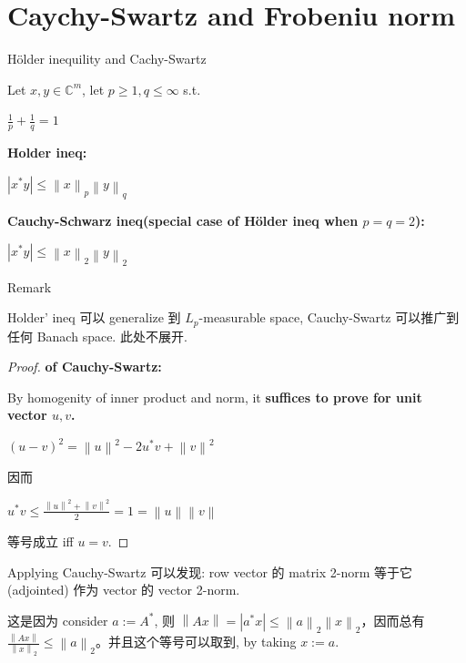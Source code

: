 \section{Caychy-Swartz and Frobeniu norm}

\begin{theorem}{Hölder inequility and Cachy-Swartz}

Let \(x,y \in \mathbb{C}^{m}\), let \(p \geq 1,q \leq \infty\) s.t.

\(\frac{1}{p} + \frac{1}{q} = 1\)

\textbf{Holder ineq:}

\(\left| {x^{\ast}y} \right| \leq \left\| x \right\|_{p}\left\| y \right\|_{q}\)

\textbf{Cauchy-Schwarz ineq(special case of Hölder ineq when \(p = q = 2\)):}

\(\left| {x^{\ast}y} \right| \leq \left\| x \right\|_{2}\left\| y \right\|_{2}\)

\end{theorem}

\begin{qlremark}{Remark}

Holder' ineq 可以 generalize 到 \(L_{p}\)-measurable space, Cauchy-Swartz 可以推广到任何 Banach space. 此处不展开.

\end{qlremark}

\begin{proof}

\textbf{of Cauchy-Swartz:}

By homogenity of inner product and norm, it \textbf{suffices to prove for unit vector \(u,v\).}

\(\left( {u - v} \right)^{2} = \left\| u \right\|^{2} - 2u^{\ast}v + \left\| v \right\|^{2}\)

因而

\(u^{\ast}v \leq \frac{\left\| u \right\|^{2} + \left\| v \right\|^{2}}{2} = 1 = \left\| u \right\|\left\| v \right\|\)

等号成立 iff \(u = v\).

\end{proof}

\begin{example}

Applying Cauchy-Swartz 可以发现: row vector 的 matrix 2-norm 等于它 (adjointed) 作为 vector 的 vector 2-norm.

这是因为 consider \(a := A^{\ast}\), 则 \(\left\| {Ax} \right\| = \left| {a^{\ast}x} \right| \leq \left\| a \right\|_{2}\left\| x \right\|_{2}\)，因而总有 \(\frac{\left\| {Ax} \right\|}{\left\| x \right\|_{2}} \leq \left\| a \right\|_{2}\)。并且这个等号可以取到, by taking \(x := a\).

\end{example}

